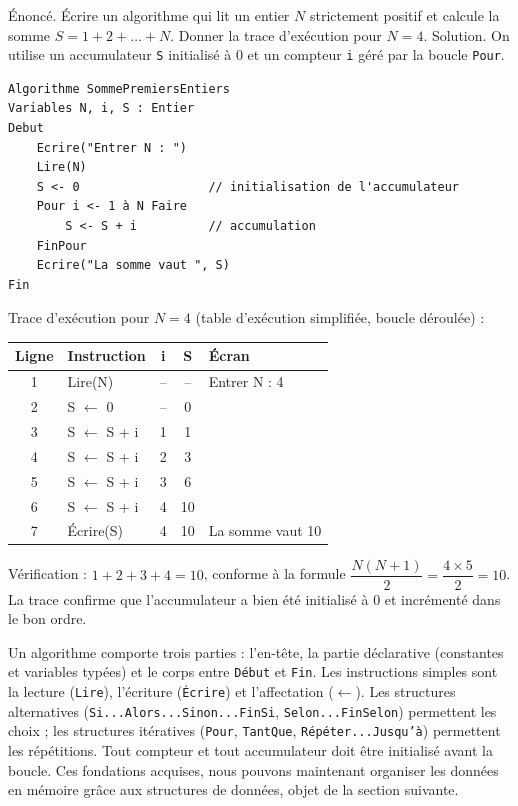 \documentclass[11pt]{article}
\begin{document}
\begin{exoresolu}
Énoncé. Écrire un algorithme qui lit un entier $N$ strictement positif et calcule la somme $S = 1 + 2 + \dots + N$. Donner la trace d'exécution pour $N = 4$.
\tcblower
Solution. On utilise un accumulateur \texttt{S} initialisé à 0 et un compteur \texttt{i} géré par la boucle \texttt{Pour}.
\begin{lstlisting}
Algorithme SommePremiersEntiers
Variables N, i, S : Entier
Debut
    Ecrire("Entrer N : ")
    Lire(N)
    S <- 0                  // initialisation de l'accumulateur
    Pour i <- 1 à N Faire
        S <- S + i          // accumulation
    FinPour
    Ecrire("La somme vaut ", S)
Fin
\end{lstlisting}
Trace d'exécution pour $N = 4$ (table d'exécution simplifiée, boucle déroulée) :
\begin{center}
\begin{tabularx}{\linewidth}{|c|l|c|c|X|}
\hline
\rowcolor{popblueL} \textbf{Ligne} & \textbf{Instruction} & \textbf{i} & \textbf{S} & \textbf{Écran} \\
\hline
1 & Lire(N) & -- & -- & Entrer N : 4 \\
\hline
2 & S $\leftarrow$ 0 & -- & 0 & \\
\hline
3 & S $\leftarrow$ S + i & 1 & 1 & \\
\hline
4 & S $\leftarrow$ S + i & 2 & 3 & \\
\hline
5 & S $\leftarrow$ S + i & 3 & 6 & \\
\hline
6 & S $\leftarrow$ S + i & 4 & 10 & \\
\hline
7 & Écrire(S) & 4 & 10 & La somme vaut 10 \\
\hline
\end{tabularx}
\end{center}
Vérification : $1+2+3+4 = 10$, conforme à la formule $\dfrac{N(N+1)}{2} = \dfrac{4 \times 5}{2} = 10$. La trace confirme que l'accumulateur a bien été initialisé à 0 et incrémenté dans le bon ordre.
\end{exoresolu}

\begin{aretenir}
Un algorithme comporte trois parties : l'en-tête, la partie déclarative (constantes et variables typées) et le corps entre \texttt{Début} et \texttt{Fin}. Les instructions simples sont la lecture (\texttt{Lire}), l'écriture (\texttt{Écrire}) et l'affectation ($\leftarrow$). Les structures alternatives (\texttt{Si...Alors...Sinon...FinSi}, \texttt{Selon...FinSelon}) permettent les choix ; les structures itératives (\texttt{Pour}, \texttt{TantQue}, \texttt{Répéter...Jusqu'à}) permettent les répétitions. Tout compteur et tout accumulateur doit être initialisé avant la boucle. Ces fondations acquises, nous pouvons maintenant organiser les données en mémoire grâce aux structures de données, objet de la section suivante.
\end{aretenir}
\end{document}
